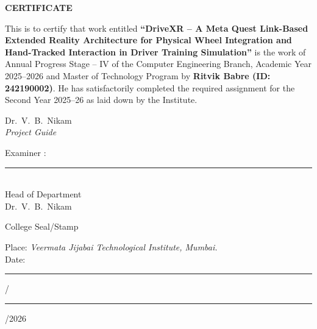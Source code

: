 \thispagestyle{empty}

\begin{center}
\vspace*{1cm}
{\Large\bfseries CERTIFICATE}
\end{center}

\vspace{0.8cm}

\begin{center}
\begin{minipage}{0.84\textwidth}
\setlength{\parindent}{0pt}
\setlength{\parskip}{0pt}
\justifying
This is to certify that work entitled
\textbf{``DriveXR -- A Meta Quest Link-Based Extended Reality Architecture
for Physical Wheel Integration and Hand-Tracked Interaction in Driver
Training Simulation''}
is the work of Annual Progress Stage -- IV of the Computer Engineering
Branch, Academic Year 2025--2026 and Master of Technology Program by
\textbf{Ritvik Babre (ID: 242190002)}.
He has satisfactorily completed the required assignment for the Second
Year 2025--26 as laid down by the Institute.
\end{minipage}
\end{center}

\vspace{2.2cm}

\noindent
\begin{minipage}[t]{0.42\textwidth}
Dr.~V.~B.~Nikam\\[0.15cm]
\textit{Project Guide}
\end{minipage}
\hfill
\begin{minipage}[t]{0.42\textwidth}
\raggedleft
Examiner :\hrulefill
\end{minipage}

\vspace{2.8cm}

\begin{flushright}
\begin{minipage}{0.32\textwidth}
\centering
\rule{\linewidth}{0.4pt}\\[0.25cm]
Head of Department\\[0.3cm]
Dr.~V.~B.~Nikam
\end{minipage}
\end{flushright}

\vfill

\noindent College Seal/Stamp

\vspace{0.8cm}

\noindent Place: \textit{Veermata Jijabai Technological Institute, Mumbai.}\\[0.5cm]
Date: \rule{0.8cm}{0.4pt}/\rule{0.8cm}{0.4pt}/2026

\clearpage